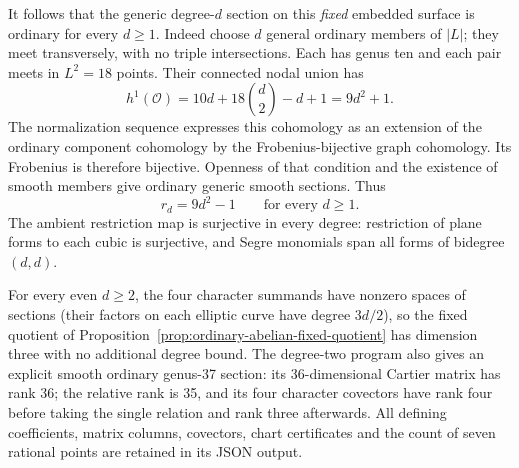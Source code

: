 \begin{example}
It follows that the generic degree-$d$ section on this
\emph{fixed} embedded surface is ordinary for every $d\geq1$.
Indeed choose $d$ general ordinary members of $|L|$;
they meet transversely, with no triple intersections.
Each has genus ten and each pair meets in $L^2=18$ points.
Their connected nodal union has
\[
 h^1(\mathcal O)=10d+18\binom d2-d+1=9d^2+1.
\]
The normalization sequence expresses this cohomology
as an extension of the ordinary component cohomology
by the Frobenius-bijective graph cohomology.  Its
Frobenius is therefore bijective.  Openness of that
condition and the existence of smooth members give
ordinary generic smooth sections.  Thus
\begin{equation}\label{eq:abelian-example-generic-rank}
 r_d=9d^2-1\qquad\text{for every }d\geq1.
\end{equation}
The ambient restriction map is surjective in every
degree: restriction of plane forms to each cubic is
surjective, and Segre monomials span all forms of
bidegree $(d,d)$.

For every even $d\geq2$, the four character summands
have nonzero spaces of sections (their factors on each
elliptic curve have degree $3d/2$), so the fixed quotient
of Proposition~\ref{prop:ordinary-abelian-fixed-quotient}
has dimension three with no additional degree bound.
The degree-two program also gives an explicit smooth
ordinary genus-37 section: its 36-dimensional Cartier
matrix has rank 36; the relative rank is 35, and its
four character covectors have rank four before taking
the single relation and rank three afterwards.
All defining coefficients, matrix columns, covectors,
chart certificates and the count of seven rational
points are retained in its JSON output.
\end{example}
